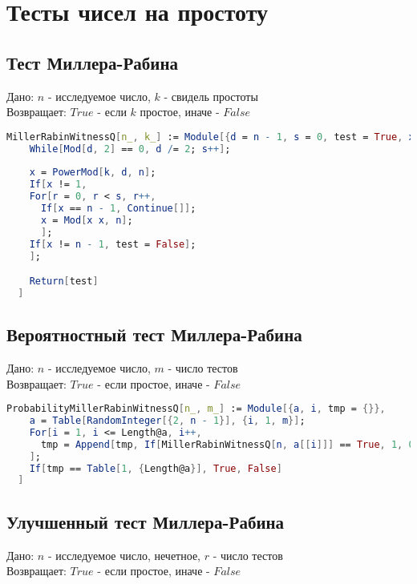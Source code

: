 \chapter{Тесты чисел на простоту}

\section{Тест Миллера-Рабина}

  Дано: {$n$} - исследуемое число, {$k$} - свидель простоты \\
  Возвращает: {$True$} - если {$k$} простое, иначе - {$False$}

\begin{lstlisting}[language=Mathematica,caption={Тест Миллера-Рабина}]
  MillerRabinWitnessQ[n_, k_] := Module[{d = n - 1, s = 0, test = True, x, a, r},
    While[Mod[d, 2] == 0, d /= 2; s++];
    
    x = PowerMod[k, d, n];
    If[x != 1,
    For[r = 0, r < s, r++,
      If[x == n - 1, Continue[]];
      x = Mod[x x, n];
      ];
    If[x != n - 1, test = False];
    ];

    Return[test]
  ]
\end{lstlisting}

\section{Вероятностный тест Миллера-Рабина}

  Дано: {$n$} - исследуемое число, {$m$} - число тестов \\
  Возвращает: {$True$} - если простое, иначе - {$False$}

\begin{lstlisting}[language=Mathematica,caption={Вероятностный тест Миллера-Рабина}]
  ProbabilityMillerRabinWitnessQ[n_, m_] := Module[{a, i, tmp = {}},
    a = Table[RandomInteger[{2, n - 1}], {i, 1, m}];
    For[i = 1, i <= Length@a, i++,
      tmp = Append[tmp, If[MillerRabinWitnessQ[n, a[[i]]] == True, 1, 0]];
    ];
    If[tmp == Table[1, {Length@a}], True, False]
  ] 
\end{lstlisting}

\section{Улучшенный тест Миллера-Рабина}

  Дано: {$n$} - исследуемое число, нечетное, {$r$} - число тестов \\
  Возвращает: {$True$} - если простое, иначе - {$False$}

